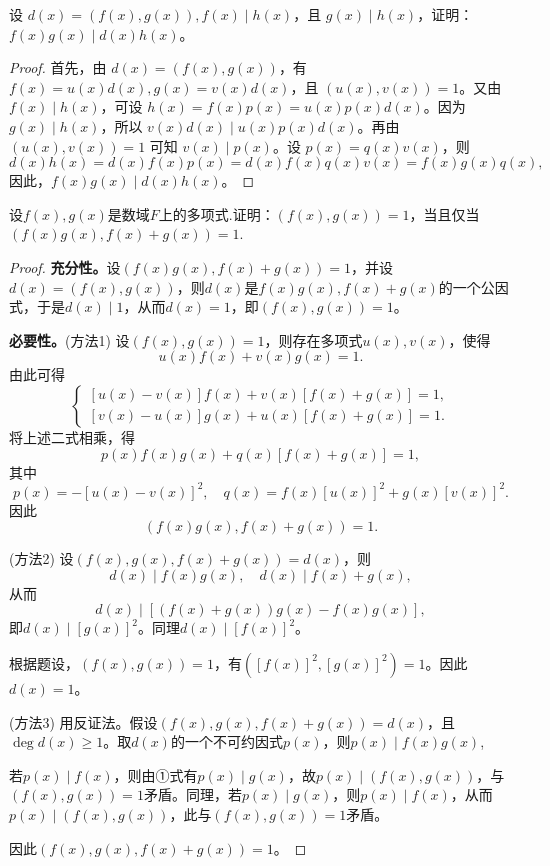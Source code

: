 \documentclass[lang=cn,12pt]{elegantbook}
\begin{document}
\begin{example}
设 \( d(x) = (f(x), g(x)), f(x) \mid h(x) \)，且 \( g(x) \mid h(x) \)，证明：\( f(x)g(x) \mid d(x)h(x) \)。
\end{example}

\begin{proof}
首先，由 \( d(x) = (f(x), g(x)) \)，有 \( f(x) = u(x)d(x), g(x) = v(x)d(x) \)，且 \( (u(x), v(x)) = 1 \)。又由 \( f(x) \mid h(x) \)，可设 \( h(x) = f(x)p(x) = u(x)p(x)d(x) \)。因为 \( g(x) \mid h(x) \)，所以 \( v(x)d(x) \mid u(x)p(x)d(x) \)。再由 \( (u(x), v(x)) = 1 \) 可知 \( v(x) \mid p(x) \)。设 \( p(x) = q(x)v(x) \)，则
\[ d(x)h(x) = d(x)f(x)p(x) = d(x)f(x)q(x)v(x) = f(x)g(x)q(x), \]
因此，\( f(x)g(x) \mid d(x)h(x) \)。
\end{proof}

\begin{example}
    设$f(x),g(x)$是数域$F$上的多项式.证明：$(f(x),g(x)) = 1$，当且仅当$(f(x)g(x),f(x)+g(x)) = 1$.
\end{example}

\begin{proof}
    \textbf{充分性。}设\( (f(x)g(x),f(x)+g(x))=1 \)，并设\( d(x)=(f(x),g(x)) \)，则\( d(x) \)是\( f(x)g(x),f(x)+g(x) \)的一个公因式，于是\( d(x) \mid 1 \)，从而\( d(x)=1 \)，即\( (f(x),g(x))=1 \)。

\textbf{必要性。}(方法1) 设\( (f(x),g(x))=1 \)，则存在多项式\( u(x),v(x) \)，使得
\[u(x)f(x)+v(x)g(x)=1.\]
由此可得
\[\begin{cases}
[u(x)-v(x)]f(x)+v(x)[f(x)+g(x)]=1,\\
[v(x)-u(x)]g(x)+u(x)[f(x)+g(x)]=1.
\end{cases}\]
将上述二式相乘，得
\[p(x)f(x)g(x)+q(x)[f(x)+g(x)]=1,\]
其中
\[p(x)=-\left[ u(x)-v(x)\right]^2, \quad q(x)=f(x)\left[ u(x)\right]^2+g(x)\left[ v(x)\right]^2.\]
因此
\[(f(x)g(x),f(x)+g(x))=1.\]

(方法2) 设\( (f(x),g(x),f(x)+g(x))=d(x) \)，则
\[d(x)\mid f(x)g(x),\quad d(x)\mid f(x)+g(x),\]
从而
\[d(x)\mid \left[\left(f(x)+g(x)\right)g(x)-f(x)g(x)\right],\]
即\( d(x)\mid \left[g(x)\right]^2 \)。同理\( d(x)\mid \left[ f(x)\right]^2 \)。

根据题设，\( (f(x),g(x))=1 \)，有\( \left(\left[ f(x)\right]^2,\left[ g(x)\right]^2\right)=1 \)。因此\( d(x)=1 \)。

(方法3) 用反证法。假设\( (f(x),g(x),f(x)+g(x))=d(x) \)，且\( \deg d(x)\geq 1 \)。取\( d(x) \)的一个不可约因式\( p(x) \)，则\( p(x)\mid f(x)g(x) \),

若\( p(x)\mid f(x) \)，则由①式有\( p(x)\mid g(x) \)，故\( p(x)\mid (f(x),g(x)) \)，与\( (f(x),g(x))=1 \)矛盾。同理，若\( p(x)\mid g(x) \)，则\( p(x)\mid f(x) \)，从而\( p(x)\mid (f(x),g(x)) \)，此与\( (f(x),g(x))=1 \)矛盾。

因此\( (f(x),g(x),f(x)+g(x))=1 \)。
\end{proof}
\end{document}
